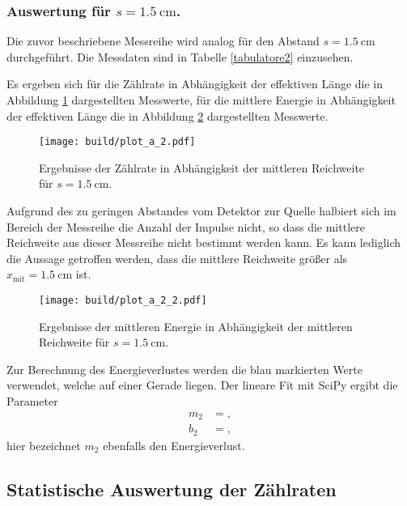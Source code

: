 \subsubsection{\texorpdfstring{Auswertung für $s=\SI{1.5}{\centi\metre}$}{Auswertung für s = 1.5 cm}.}
Die zuvor beschriebene Messreihe wird analog für den Abstand $s = \SI{1.5}{\centi\metre}$ durchgeführt.
Die Messdaten sind in Tabelle \ref{tabulatore2} einzusehen.

Es ergeben sich für die Zählrate in Abhängigkeit der effektiven Länge die in Abbildung \ref{abb:4} dargestellten Messwerte, für die mittlere Energie in Abhängigkeit der effektiven Länge die in Abbildung \ref{abb:5} dargestellten Messwerte.

\begin{figure}
  \centering
  \texttt{[image: build/plot\_a\_2.pdf]}
  \caption{Ergebnisse der Zählrate in Abhängigkeit der mittleren Reichweite für $s = \SI{1.5}{\centi\metre}$.}
  \label{abb:4}
\end{figure}

Aufgrund des zu geringen Abstandes vom Detektor zur Quelle halbiert sich im Bereich der Messreihe die Anzahl der Impulse nicht, so dass die mittlere Reichweite aus dieser Messreihe nicht bestimmt werden kann.
Es kann lediglich die Aussage getroffen werden, dass die mittlere Reichweite größer als $x_\text{mit} = \SI{1.5}{\centi\metre}$ ist.

\begin{figure}
  \centering
  \texttt{[image: build/plot\_a\_2\_2.pdf]}
  \caption{Ergebnisse der mittleren Energie in Abhängigkeit der mittleren Reichweite für $s = \SI{1.5}{\centi\metre}$.}
  \label{abb:5}
\end{figure}

Zur Berechnung des Energieverlustes werden die blau markierten Werte verwendet, welche auf einer Gerade liegen.
Der lineare Fit mit SciPy ergibt die Parameter
\begin{align*}
  m_2 &= ,\\
  b_2 &= ,
\end{align*}
hier bezeichnet $m_2$ ebenfalls den Energieverlust.

\subsection{Statistische Auswertung der Zählraten}
